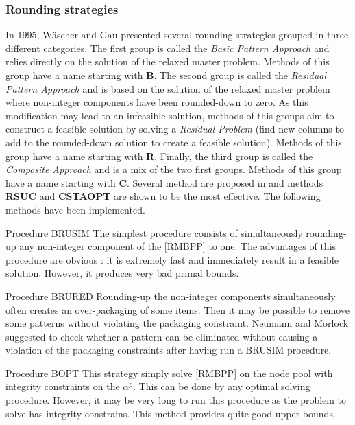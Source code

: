 \subsubsection{Rounding strategies}

In 1995, Wäscher and Gau \cite{wascher1996heuristics} presented several rounding strategies grouped in three different categories. The first group is called the \textit{Basic Pattern Approach} and relies directly on the solution of the relaxed master problem. Methods of this group have a name starting with \textbf{B}. The second group is called the \textit{Residual Pattern Approach} and is based on the solution of the relaxed master problem where non-integer components have been rounded-down to zero. As this modification may lead to an infeasible solution, methods of this groups aim to construct a feasible solution by solving a \textit{Residual Problem} (find new columns to add to the rounded-down solution to create a feasible solution).  Methods of this group have a name starting with \textbf{R}. Finally, the third group is called the \textit{Composite Approach} and is a mix of the two first groups.  Methods of this group have a name starting with \textbf{C}. Several method are proposed in \cite{wascher1996heuristics} and methods \textbf{RSUC} and \textbf{CSTAOPT} are shown to be the most effective. The following methods have been implemented.

\begin{paragraph}{Procedure BRUSIM}
	The simplest procedure consists of simultaneously rounding-up any non-integer component of the \eqref{RMBPP} to one. The advantages of this procedure are obvious : it is extremely fast and immediately result in a feasible solution. However, it produces very bad primal bounds.
\end{paragraph}

\begin{paragraph}{Procedure BRURED}
	Rounding-up the non-integer components simultaneously often creates an over-packaging of some items. Then it may be possible to remove some patterns without violating the packaging constraint. Neumann and Morlock \cite{bankhofer2000quantitative} suggested to check whether a pattern can be eliminated without causing a violation of the packaging constraints after having run a BRUSIM procedure.
\end{paragraph}

\begin{paragraph}{Procedure BOPT}
	This strategy simply solve \eqref{RMBPP} on the node pool with integrity constraints on the $\alpha^p$. This can be done by any optimal solving procedure. However, it may be very long to run this procedure as the problem to solve has integrity constrains. This method provides quite good upper bounds.
\end{paragraph}


